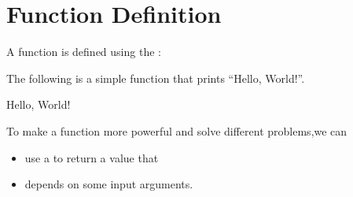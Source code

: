 \documentclass[letterpaper,10pt,english]{sphinxmanual}
\begin{document}
\section{Function Definition}
\label{\detokenize{Lecture4/Writing Functions:function-definition}}

A function is defined using the :

The following is a simple function that prints “Hello, World!”.

\begin{sphinxVerbatim}[commandchars=\\\{\}]
 
\end{sphinxVerbatim}

\begin{sphinxVerbatim}[commandchars=\\\{\}]
\end{sphinxVerbatim}

\begin{sphinxVerbatim}[commandchars=\\\{\}]
Hello, World!
\end{sphinxVerbatim}

To make a function more powerful and solve different problems,we can
\begin{itemize}
\item {} 
use a  to return a value that

\item {} 
depends on some input arguments.

\end{itemize}

\begin{sphinxVerbatim}[commandchars=\\\{\}]
 
       


\end{sphinxVerbatim}
\end{document}
